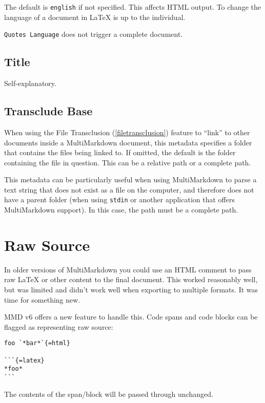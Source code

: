 The default is \texttt{english} if not specified. This affects HTML output. To
change the language of a document in LaTeX is up to the individual.

\texttt{Quotes Language} does not trigger a complete document.

\subsection{Title}
\label{title}

Self-explanatory.

\subsection{Transclude Base}
\label{transcludebase}

When using the File Transclusion (\autoref{filetransclusion}) feature to ``link'' to other documents inside a MultiMarkdown document, this metadata specifies a folder that contains the files being linked to. If omitted, the default is the folder containing the file in question. This can be a relative path or a complete path.

This metadata can be particularly useful when using MultiMarkdown to parse a text string that does not exist as a file on the computer, and therefore does not have a parent folder (when using \texttt{stdin} or another application that offers MultiMarkdown support). In this case, the path must be a complete path.

\section{Raw Source}
\label{rawsource}

In older versions of MultiMarkdown you could use an HTML comment to pass raw LaTeX or other content to the final document. This worked reasonably well, but was limited and didn't work well when exporting to multiple formats. It was time for something new.

\gls{MMD} v6 offers a new feature to handle this. Code spans and code blocks can be flagged as representing raw source:

\begin{verbatim}
foo `*bar*`{=html}

```{=latex}
*foo*
```
\end{verbatim}

The contents of the span\slash block will be passed through unchanged.

